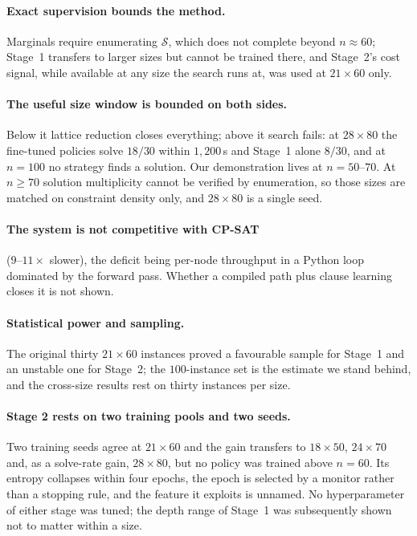 \documentclass[final,5p,times,twocolumn]{elsarticle}
\newcommand{\SOL}{\mathcal{S}}
\begin{document}
\paragraph{Exact supervision bounds the method.} Marginals require enumerating $\SOL$, which does not complete beyond $n\approx60$; Stage~1 transfers to larger sizes but cannot be trained there, and Stage~2's cost signal, while available at any size the search runs at, was used at $21\times60$ only.

\paragraph{The useful size window is bounded on both sides.} Below it lattice reduction closes everything; above it search fails: at $28\times80$ the fine-tuned policies solve $18/30$ within $1{,}200$\,s and Stage~1 alone $8/30$, and at $n=100$ no strategy finds a solution. Our demonstration lives at $n=50$--$70$. At $n\ge70$ solution multiplicity cannot be verified by enumeration, so those sizes are matched on constraint density only, and $28\times80$ is a single seed.

\paragraph{The system is not competitive with CP-SAT} ($9$--$11\times$ slower), the deficit being per-node throughput in a Python loop dominated by the forward pass. Whether a compiled path plus clause learning closes it is not shown.

\paragraph{Statistical power and sampling.} The original thirty $21\times60$ instances proved a favourable sample for Stage~1 and an unstable one for Stage~2; the $100$-instance set is the estimate we stand behind, and the cross-size results rest on thirty instances per size.

\paragraph{Stage 2 rests on two training pools and two seeds.} Two training seeds agree at $21\times60$ and the gain transfers to $18\times50$, $24\times70$ and, as a solve-rate gain, $28\times80$, but no policy was trained above $n=60$. Its entropy collapses within four epochs, the epoch is selected by a monitor rather than a stopping rule, and the feature it exploits is unnamed. No hyperparameter of either stage was tuned; the depth range of Stage~1 was subsequently shown not to matter within a size.
\end{document}
